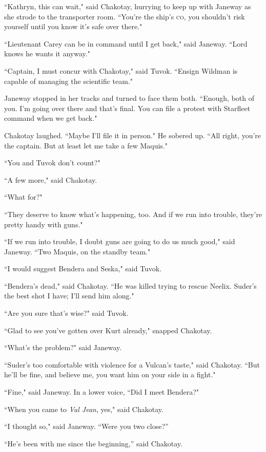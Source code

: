 \documentclass[twoside,letterpaper,12pt]{memoir}
\begin{document}
``Kathryn, this can wait," said Chakotay, hurrying to keep up with Janeway as she strode to the transporter room. ``You're the ship's \textsc{co}, you shouldn't risk yourself until you know it's safe over there." 

``Lieutenant Carey can be in command until I get back," said Janeway. ``Lord knows he wants it anyway." 

``Captain, I must concur with Chakotay," said Tuvok. ``Ensign Wildman is capable of managing the scientific team." 

Janeway stopped in her tracks and turned to face them both. ``Enough, both of you. I'm going over there and that's final. You can file a protest with Starfleet command when we get back." 

Chakotay laughed. ``Maybe I'll file it in person." He sobered up. ``All right, you're the captain. But at least let me take a few Maquis." 

``You and Tuvok don't count?" 

``A few more," said Chakotay. 

``What for?" 

``They deserve to know what's happening, too. And if we run into trouble, they're pretty handy with guns." 

``If we run into trouble, I doubt guns are going to do us much good," said Janeway. ``Two Maquis, on the standby team." 

``I would suggest Bendera and Seska," said Tuvok. 

``Bendera's dead," said Chakotay. ``He was killed trying to rescue Neelix. Suder's the best shot I have; I'll send him along." 

``Are you sure that's wise?" said Tuvok. 

``Glad to see you've gotten over Kurt already," snapped Chakotay. 

``What's the problem?" said Janeway. 

``Suder's too comfortable with violence for a Vulcan's taste," said Chakotay. ``But he'll be fine, and believe me, you want him on your side in a fight." 

``Fine," said Janeway. In a lower voice, ``Did I meet Bendera?" 

``When you came to \textit{Val Jean}, yes," said Chakotay. 

``I thought so," said Janeway. ``Were you two close?” 

``He’s been with me since the beginning,” said Chakotay. 
\end{document}
